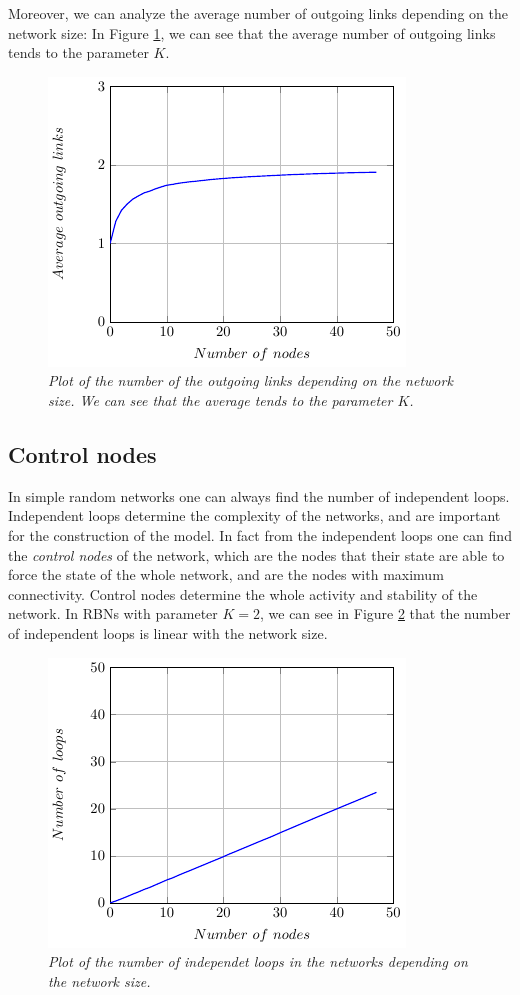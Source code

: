 Moreover, we can analyze the average number of outgoing links depending on the network size: In Figure \ref{fig:outgoing}, we can see that the average number of outgoing links tends to the parameter $K$.
\begin{figure}[h]
\centering
\includegraphics[scale=1.5]{images/outgoing.pdf}
\caption{\emph{Plot of the number of the outgoing links depending on the network size. We can see that the average tends to the parameter $K$. }}
\label{fig:outgoing}
\end{figure}



\subsection{Control nodes}
In simple random networks one can always find the number of independent loops.
Independent loops determine the complexity of the networks\cite{K38}, and are important for the construction of the model. In fact from the independent loops one can find the \emph{control nodes} of the network, which are the nodes that their state are able to force the state of the whole network, and are the nodes with maximum connectivity. Control nodes determine the whole activity and stability of the network. 
In RBNs with parameter $K=2$, we can see in Figure \ref{fig:loops} that the number of independent loops is linear with the network size.
\begin{figure}[h]
\centering
\includegraphics[scale=1.5]{images/loops.pdf}
\caption{\emph{Plot of the number of independet loops in the networks depending on the network size.}}
\label{fig:loops}
\end{figure}

